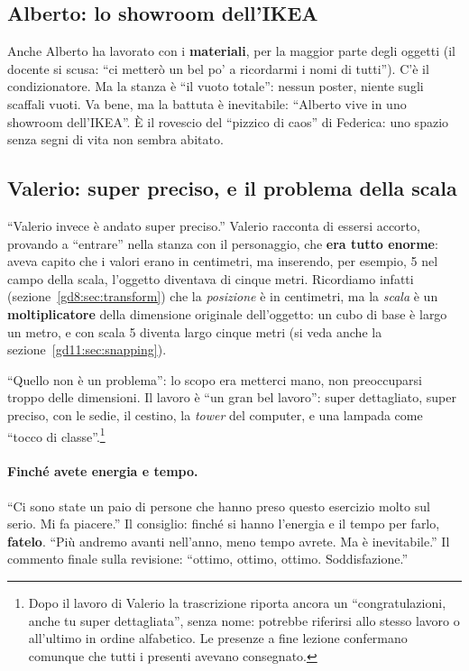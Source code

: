 \subsection{Alberto: lo showroom dell'IKEA}

Anche Alberto ha lavorato con i \textbf{materiali}, per la maggior parte degli
oggetti (il docente si scusa: ``ci metterò un bel po' a ricordarmi i nomi di
tutti''). C'è il condizionatore. Ma la stanza è ``il vuoto totale'': nessun
poster, niente sugli scaffali vuoti. Va bene, ma la battuta è inevitabile:
``Alberto vive in uno showroom dell'IKEA''. È il rovescio del ``pizzico di
caos'' di Federica: uno spazio senza segni di vita non sembra abitato.

\subsection{Valerio: super preciso, e il problema della scala}

``Valerio invece è andato super preciso.'' Valerio racconta di essersi accorto,
provando a ``entrare'' nella stanza con il personaggio, che \textbf{era tutto
enorme}: aveva capito che i valori erano in centimetri, ma inserendo, per
esempio, 5 nel campo della scala, l'oggetto diventava di cinque metri.
Ricordiamo infatti (sezione~\ref{gd8:sec:transform}) che la \emph{posizione} è
in centimetri, ma la \emph{scala} è un \textbf{moltiplicatore} della dimensione
originale dell'oggetto: un cubo di base è largo un metro, e con scala 5 diventa
largo cinque metri (si veda anche la sezione~\ref{gd11:sec:snapping}).

``Quello non è un problema'': lo scopo era metterci mano, non preoccuparsi
troppo delle dimensioni. Il lavoro è ``un gran bel lavoro'': super dettagliato,
super preciso, con le sedie, il cestino, la \emph{tower} del computer, e una
lampada come ``tocco di classe''.\footnote{Dopo il lavoro di Valerio la
trascrizione riporta ancora un ``congratulazioni, anche tu super dettagliata'',
senza nome: potrebbe riferirsi allo stesso lavoro o all'ultimo in ordine
alfabetico. Le presenze a fine lezione confermano comunque che tutti i presenti
avevano consegnato.}

\paragraph{Finché avete energia e tempo.} ``Ci sono state un paio di persone
che hanno preso questo esercizio molto sul serio. Mi fa piacere.'' Il
consiglio: finché si hanno l'energia e il tempo per farlo, \textbf{fatelo}.
``Più andremo avanti nell'anno, meno tempo avrete. Ma è inevitabile.''
Il commento finale sulla revisione: ``ottimo, ottimo, ottimo. Soddisfazione.''

